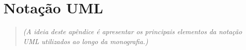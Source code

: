 \chapter{Notação UML}
\label{cap:isv:uml} %

\begin{quote}
\textit{(A ideia deste apêndice é apresentar os principais elementos da notação UML utilizados ao longo da monografia.)}
\end{quote}
